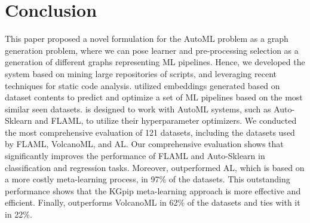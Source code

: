 
\section{Conclusion}
\label{sec:con} 

This paper proposed a novel formulation for the AutoML problem as a graph generation problem, where we can pose learner and pre-processing selection as a generation of different graphs representing ML pipelines. Hence, we developed the {\sysname} system based on mining large repositories of scripts, and leveraging recent techniques for static code analysis. {\sysname} utilized embeddings generated based on dataset contents to predict and optimize a set of ML pipelines based on the most similar seen datasets. {\sysname} is designed to work with AutoML systems, such as Auto-Sklearn and FLAML, to utilize their hyperparameter optimizers. We conducted the most comprehensive evaluation of 121 datasets, including the datasets used by FLAML, VolcanoML, and AL. Our comprehensive evaluation shows that {\sysname} significantly improves the performance of FLAML and Auto-Sklearn in classification and regression tasks. Moreover, {\sysname} outperformed AL, which is based on a more costly meta-learning process, in 97\% of the datasets. This outstanding performance shows that the KGpip meta-learning approach is more effective and efficient. Finally, {\sysname} outperforms VolcanoML in 62\% of the datasets and ties with it in 22\%.   


